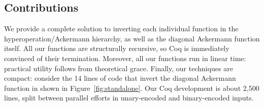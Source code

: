 \subsection{Contributions}
We provide a complete solution to inverting each individual function in the hyperoperation/Ackermann hierarchy,
as well as the diagonal Ackermann function itself.  All our functions are structurally recursive, so
Coq is immediately convinced of their termination.  Moreover, all our functions run in linear time: practical utility follows from theoretical grace.
Finally, our techniques are compact: consider the 14 lines of code that invert the diagonal Ackermann function in  shown in Figure~\ref{fig:standalone}. Our Coq development is about 2,500 lines, split between parallel efforts in unary-encoded and binary-encoded inputs.
